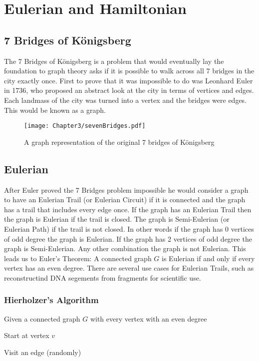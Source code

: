 \chapter{Eulerian and Hamiltonian}
\section{7 Bridges of K\"{o}nigsberg}
The 7 Bridges of K\"{o}nigsberg is a problem that would eventually lay the foundation to graph theory asks if it is possible to walk across all 7 bridges in the city exactly once. First to prove that it was impossible to do was Leonhard Euler in 1736, who proposed an abstract look at the city in terms of vertices and edges. Each landmass of the city was turned into a vertex and the bridges were edges. This would be known as a graph.\cite{7Bridges}
  \begin{figure}[!h]
	\centering
  	\texttt{[image: Chapter3/sevenBridges.pdf]}
	\caption{A graph representation of the original 7 bridges of K\"{o}nigsberg}
  \end{figure}

    \section{Eulerian}
  After Euler proved the 7 Bridges problem impossible he would consider a graph to have an Eulerian Trail (or Eulerian Circuit) if it is connected and the graph has a trail that includes every edge once. If the graph has an Eulerian Trail then the graph is Eulerian if the trail is closed. The graph is Semi-Eulerian (or Eulerian Path) if the trail is not closed. In other words if the graph has 0 vertices of odd degree the graph is Eulerian. If the graph has 2 vertices of odd degree the graph is Semi-Eulerian. Any other combination the graph is not Eulerian. This leads us to Euler's Theorem: A connected graph $G$ is Eulerian if and only if every vertex has an even degree. There are several use cases for Eulerian Trails, such as reconstructind DNA segements from fragments for scientific use.\cite{EulerianAlgos} 

  \subsection{Hierholzer's Algorithm}
  Given a connected graph $G$ with every vertex with an even degree 

  Start at vertex $v$

  Visit an edge (randomly)

